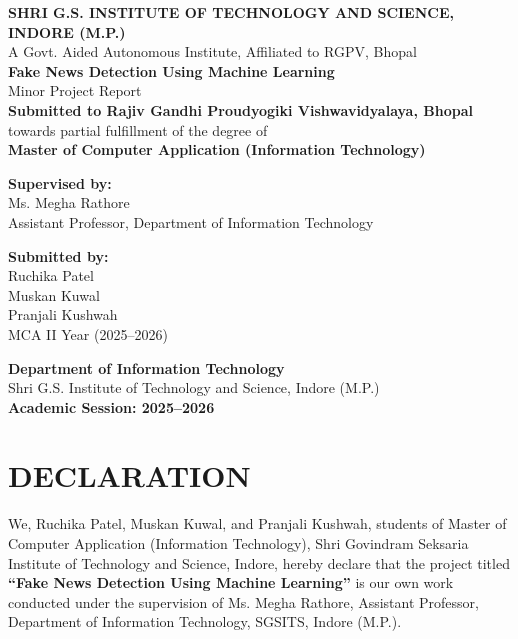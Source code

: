 \documentclass[12pt,a4paper]{report}
\begin{document}
\begin{titlepage}
\centering
{\Large \textbf{SHRI G.S. INSTITUTE OF TECHNOLOGY AND SCIENCE, INDORE (M.P.)}}\\[0.3cm]
A Govt. Aided Autonomous Institute, Affiliated to RGPV, Bhopal \\[2cm]
{\Huge \textbf{Fake News Detection Using Machine Learning}}\\[0.7cm]
{\Large Minor Project Report}\\[1cm]
\textbf{Submitted to Rajiv Gandhi Proudyogiki Vishwavidyalaya, Bhopal}\\
towards partial fulfillment of the degree of\\
\textbf{Master of Computer Application (Information Technology)}\\[2cm]
\begin{flushleft}
\textbf{Supervised by:}\\
Ms. Megha Rathore\\
Assistant Professor, Department of Information Technology
\end{flushleft}
\begin{flushright}
\textbf{Submitted by:}\\
Ruchika Patel\\
Muskan Kuwal\\
Pranjali Kushwah\\[0.3cm]
MCA II Year (2025–2026)
\end{flushright}
\vfill
\textbf{Department of Information Technology}\\
Shri G.S. Institute of Technology and Science, Indore (M.P.)\\
\textbf{Academic Session: 2025–2026}
\end{titlepage}
\chapter*{DECLARATION}
We, Ruchika Patel, Muskan Kuwal, and Pranjali Kushwah, students of Master of Computer Application (Information Technology), Shri Govindram Seksaria Institute of Technology and Science, Indore, hereby declare that the project titled \textbf{“Fake News Detection Using Machine Learning”} is our own work conducted under the supervision of Ms. Megha Rathore, Assistant Professor, Department of Information Technology, SGSITS, Indore (M.P.).
\end{document}
